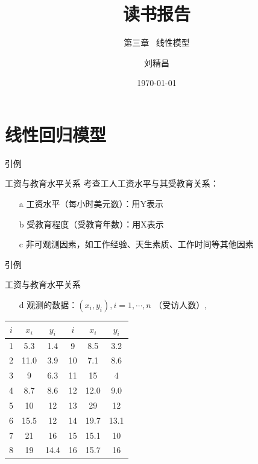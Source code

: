 \documentclass[xetex,mathserif,serif]{beamer}
\begin{document}
\title[机器学习读书会报告] %
{读书报告}
\subtitle{第三章 \ 线性模型}
\author{刘精昌 } %
\date{\today}
\subject{读书会}

\begin{frame}
\titlepage
\end{frame}

\section{线性回归模型}

\begin{frame}{引例}
  \begin{block}{工资与教育水平关系}
    考查工人工资水平与其受教育关系：
    \begin{itemize}
      \item[a] 工资水平（每小时美元数）：用Y表示
      \item[b] 受教育程度（受教育年数）：用X表示
      \item[c] 非可观测因素，如工作经验、天生素质、工作时间等其他因素
    \end{itemize}
  \end{block}
\end{frame}

\begin{frame}{引例}
    \begin{block}{工资与教育水平关系}
    \begin{itemize}
      \item[d] 观测的数据：$\left(x_i,y_i\right),i=1,\cdots,n$ （受访人数）,
    \end{itemize}
    \end{block}

    \begin{center}
    \begin{tabular}{c||c c|c||c c}
      \hline
      $i$ & $x_i$ & $y_i$ & $i$ & $x_i$ & $y_i$ \\
      \hline
      1 & 5.3 & 1.4 & 9 & 8.5 & 3.2 \\
      2 & 11.0 & 3.9 & 10 & 7.1 & 8.6 \\
      3 & 9 & 6.3 & 11 & 15 & 4 \\
      4 & 8.7 & 8.6 & 12 & 12.0 & 9.0 \\
      5 & 10 & 12 & 13 & 29 & 12 \\
      6 & 15.5 & 12 & 14 & 19.7 & 13.1 \\
      7 & 21 & 16 & 15 & 15.1 & 10 \\
      8 & 19 & 14.4 & 16 & 15.7 & 16 \\
      \hline
    \end{tabular}
    \end{center}

\end{frame}
\end{document}
